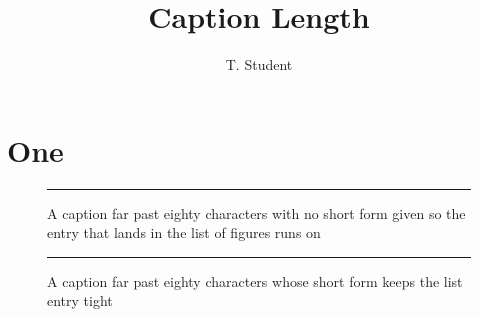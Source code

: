 \documentclass[phd,@OPTIONS@,12pt,a4paper]{bangorthesis}
\title{Caption Length}
\author{T. Student}
\begin{document}
\maketitle
\chapter{One}
\begin{figure}[htbp]
  \centering
  \rule{3cm}{1.5cm}
  \caption{A caption far past eighty characters with no short form given so the entry that lands in the list of figures runs on}
\end{figure}
\begin{figure}[htbp]
  \centering
  \rule{3cm}{1.5cm}
  \caption[Short]{A caption far past eighty characters whose short form keeps the list entry tight}
\end{figure}
\end{document}
